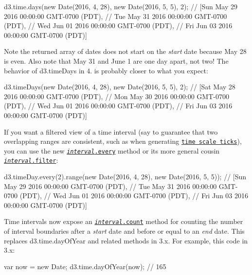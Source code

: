 \begin{DoxyCode}
d3.time.days(new Date(2016, 4, 28), new Date(2016, 5, 5), 2);
// [Sun May 29 2016 00:00:00 GMT-0700 (PDT),
//  Tue May 31 2016 00:00:00 GMT-0700 (PDT),
//  Wed Jun 01 2016 00:00:00 GMT-0700 (PDT),
//  Fri Jun 03 2016 00:00:00 GMT-0700 (PDT)]
\end{DoxyCode}


Note the returned array of dates does not start on the {\itshape start} date because May 28 is even. Also note that May 31 and June 1 are one day apart, not two! The behavior of d3.\+time\+Days in 4. is probably closer to what you expect\+:


\begin{DoxyCode}
d3.timeDays(new Date(2016, 4, 28), new Date(2016, 5, 5), 2);
// [Sat May 28 2016 00:00:00 GMT-0700 (PDT),
//  Mon May 30 2016 00:00:00 GMT-0700 (PDT),
//  Wed Jun 01 2016 00:00:00 GMT-0700 (PDT),
//  Fri Jun 03 2016 00:00:00 GMT-0700 (PDT)]
\end{DoxyCode}


If you want a filtered view of a time interval (say to guarantee that two overlapping ranges are consistent, such as when generating \href{https://github.com/d3/d3-scale/blob/master/README.md#time_ticks}{\tt time scale ticks}), you can use the new \href{https://github.com/d3/d3-time/blob/master/README.md#interval_every}{\tt {\itshape interval}.every} method or its more general cousin \href{https://github.com/d3/d3-time/blob/master/README.md#interval_filter}{\tt {\itshape interval}.filter}\+:


\begin{DoxyCode}
d3.timeDay.every(2).range(new Date(2016, 4, 28), new Date(2016, 5, 5));
// [Sun May 29 2016 00:00:00 GMT-0700 (PDT),
//  Tue May 31 2016 00:00:00 GMT-0700 (PDT),
//  Wed Jun 01 2016 00:00:00 GMT-0700 (PDT),
//  Fri Jun 03 2016 00:00:00 GMT-0700 (PDT)]
\end{DoxyCode}


Time intervals now expose an \href{https://github.com/d3/d3-time/blob/master/README.md#interval_count}{\tt {\itshape interval}.count} method for counting the number of interval boundaries after a {\itshape start} date and before or equal to an {\itshape end} date. This replaces d3.\+time.\+day\+Of\+Year and related methods in 3.\+x. For example, this code in 3.\+x\+:


\begin{DoxyCode}
var now = new Date;
d3.time.dayOfYear(now); // 165
\end{DoxyCode}


